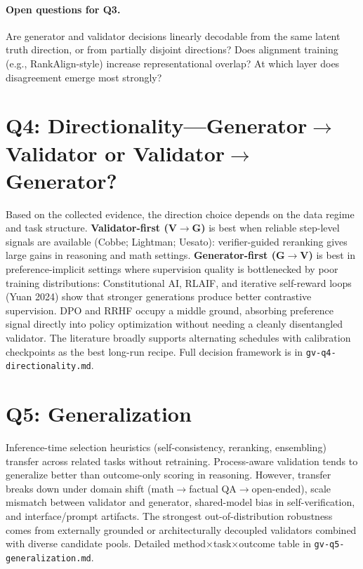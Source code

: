 \documentclass[11pt]{article}
\begin{document}
\paragraph{Open questions for Q3.}
Are generator and validator decisions linearly decodable from the same latent truth direction, or from partially disjoint directions? Does alignment training (e.g., RankAlign-style) increase representational overlap? At which layer does disagreement emerge most strongly?

\section{Q4: Directionality---Generator$\to$Validator or Validator$\to$Generator?}

Based on the collected evidence, the direction choice depends on the data regime and task structure. \textbf{Validator-first (V$\to$G)} is best when reliable step-level signals are available (Cobbe; Lightman; Uesato): verifier-guided reranking gives large gains in reasoning and math settings. \textbf{Generator-first (G$\to$V)} is best in preference-implicit settings where supervision quality is bottlenecked by poor training distributions: Constitutional AI, RLAIF, and iterative self-reward loops (Yuan 2024) show that stronger generations produce better contrastive supervision. DPO and RRHF occupy a middle ground, absorbing preference signal directly into policy optimization without needing a cleanly disentangled validator. The literature broadly supports alternating schedules with calibration checkpoints as the best long-run recipe. Full decision framework is in \texttt{gv-q4-directionality.md}.

\section{Q5: Generalization}

Inference-time selection heuristics (self-consistency, reranking, ensembling) transfer across related tasks without retraining. Process-aware validation tends to generalize better than outcome-only scoring in reasoning. However, transfer breaks down under domain shift (math$\to$factual QA$\to$open-ended), scale mismatch between validator and generator, shared-model bias in self-verification, and interface/prompt artifacts. The strongest out-of-distribution robustness comes from externally grounded or architecturally decoupled validators combined with diverse candidate pools. Detailed method$\times$task$\times$outcome table in \texttt{gv-q5-generalization.md}.
\end{document}

